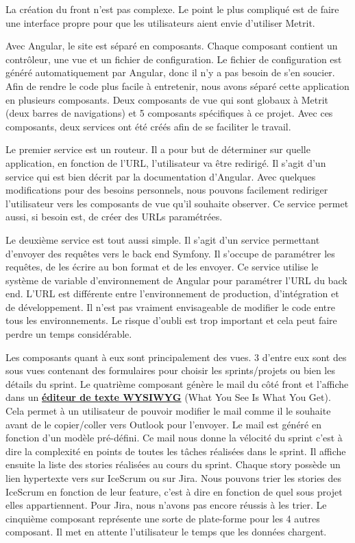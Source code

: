 \documentclass[12pt, twoside, openright]{report}
\begin{document}
La création du front n'est pas complexe. Le point le plus compliqué est de faire une interface propre pour que les utilisateurs aient envie d'utiliser Metrit. 

Avec Angular, le site est séparé en composants. Chaque composant contient un contrôleur, une vue et un fichier de configuration. Le fichier de configuration est généré automatiquement par Angular, donc il n'y a pas besoin de s'en soucier. Afin de rendre le code plus facile à entretenir, nous avons séparé cette application en plusieurs composants. Deux composants de vue qui sont globaux à Metrit (deux barres de navigations) et 5 composants spécifiques à ce projet. Avec ces composants, deux services ont été créés afin de se faciliter le travail.

Le premier service est un routeur. Il a pour but de déterminer sur quelle application, en fonction de l'URL, l'utilisateur va être redirigé. Il s'agit d'un service qui est bien décrit par la documentation d'Angular. Avec quelques modifications pour des besoins personnels, nous pouvons facilement rediriger l'utilisateur vers les composants de vue qu'il souhaite observer. Ce service permet aussi, si besoin est, de créer des URLs paramétrées.

Le deuxième service est tout aussi simple. Il s'agit d'un service permettant d'envoyer des requêtes vers le back end Symfony. Il s'occupe de paramétrer les requêtes, de les écrire au bon format et de les envoyer. Ce service utilise le système de variable d'environnement de Angular pour paramétrer l'URL du back end. L'URL est différente entre l'environnement de production, d'intégration et de développement. Il n'est pas vraiment envisageable de modifier le code entre tous les environnements. Le risque d'oubli est trop important et cela peut faire perdre un temps considérable. 

Les composants quant à eux sont principalement des vues. 3 d'entre eux sont des sous vues contenant des formulaires pour choisir les sprints/projets ou bien les détails du sprint. Le quatrième composant génère le mail du côté front et l'affiche dans un \href{https://github.com/Sibiraj-S/ngx-editor}{\textbf{éditeur de texte WYSIWYG}} (What You See Is What You Get). Cela permet à un utilisateur de pouvoir modifier le mail comme il le souhaite avant de le copier/coller vers Outlook pour l'envoyer. Le mail est généré en fonction d'un modèle pré-défini. Ce mail nous donne la vélocité du sprint c'est à dire la complexité en points de toutes les tâches réalisées dans le sprint. Il affiche ensuite la liste des stories réalisées au cours du sprint. Chaque story possède un lien hypertexte vers sur IceScrum ou sur Jira. Nous pouvons trier les stories des IceScrum en fonction de leur feature, c'est à dire en fonction de quel sous projet elles appartiennent. Pour Jira, nous n'avons pas encore réussis à les trier. Le cinquième composant représente une sorte de plate-forme pour les 4 autres composant. Il met en attente l'utilisateur le temps que les données chargent.
\end{document}
